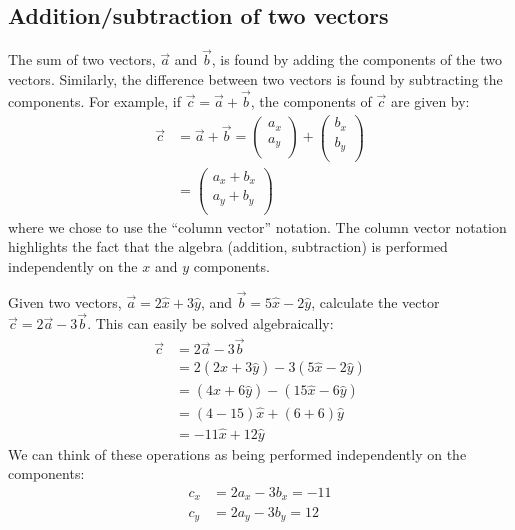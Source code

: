 \subsection{Addition/subtraction of two vectors}
The sum of two vectors, $\vec a$ and $\vec b$, is found by adding the components of the two vectors. Similarly, the difference between two vectors is found by subtracting the components. For example, if $\vec c=\vec a+\vec b$, the components of $\vec c$ are given by:
\begin{align*}
\vec c &= \vec a + \vec b = \begin{pmatrix}
           a_x \\
           a_y \\
         \end{pmatrix} + \begin{pmatrix}
           b_x \\
           b_y \\
         \end{pmatrix}\\
         &=\begin{pmatrix}
           a_x+b_x \\
           a_y+b_y \\
         \end{pmatrix}
\end{align*}
where we chose to use the ``column vector'' notation. The column vector notation highlights the fact that the algebra (addition, subtraction) is performed independently on the $x$ and $y$ components. 
\begin{example}{Given two vectors, $\vec a=2\hat x+3\hat y$, and $\vec b=5\hat x-2\hat y$, calculate the vector $\vec c= 2\vec a- 3\vec b$.}
This can easily be solved algebraically:
\begin{align*}
\vec c &= 2\vec a- 3\vec b\\
&=2 (2\hat x+3\hat y) - 3 (5\hat x-2\hat y) \\
&=(4\hat x+6\hat y)-(15\hat x-6\hat y) \\
&=(4-15)\hat x + (6+6) \hat y\\
&= -11 \hat x + 12 \hat y
\end{align*}
We can think of these operations as being performed independently on the components:
\begin{align*}
c_x&=2a_x-3b_x=-11\\
c_y&=2a_y-3b_y=12
\end{align*} 
\end{example}

